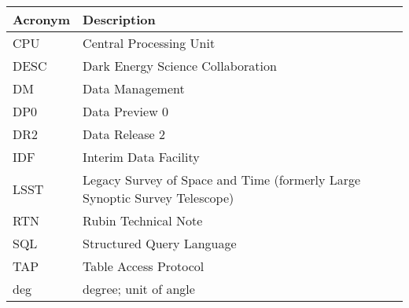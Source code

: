 \addtocounter{table}{-1}
\begin{longtable}{p{}p{}}\hline
\textbf{Acronym} & \textbf{Description}  \\\hline

CPU & Central Processing Unit \\\hline
DESC & Dark Energy Science Collaboration \\\hline
DM & Data Management \\\hline
DP0 & Data Preview 0 \\\hline
DR2 & Data Release 2 \\\hline
IDF & Interim Data Facility \\\hline
LSST & Legacy Survey of Space and Time (formerly Large Synoptic Survey Telescope) \\\hline
RTN & Rubin Technical Note \\\hline
SQL & Structured Query Language \\\hline
TAP & Table Access Protocol \\\hline
deg & degree; unit of angle \\\hline
\end{longtable}
